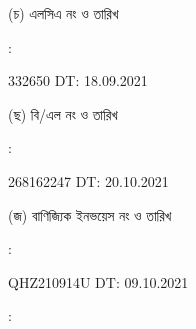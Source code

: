 \documentclass[12pt]{article}
\newcommand{\blno}{268162247}
\newcommand{\bldt}{20.10.2021}
\newcommand{\lcano}{332650}
\newcommand{\lcadt}{18.09.2021}
\newcommand{\invno}{QHZ210914U}
\newcommand{\invdt}{09.10.2021}
\begin{document}
\begin{minipage}[t]{0.05\linewidth}
\hspace*{1em}
\end{minipage}
\begin{minipage}[t]{0.45\linewidth}
(চ) এলসিএ নং ও তারিখ
\end{minipage}
\begin{minipage}[t]{0.02\linewidth}
:
\end{minipage}
\begin{minipage}[t]{0.50\linewidth}
{\lcano} \hspace{2em} DT: {\lcadt}
\\
\end{minipage}
\begin{minipage}[t]{0.05\linewidth}
\hspace*{1em}
\end{minipage}
\begin{minipage}[t]{0.45\linewidth}
(ছ) বি/এল নং ও তারিখ
\end{minipage}
\begin{minipage}[t]{0.02\linewidth}
:
\end{minipage}
\begin{minipage}[t]{0.50\linewidth}
{\blno} \hspace{2em} DT: {\bldt}
\\
\end{minipage}
\begin{minipage}[t]{0.05\linewidth}
\hspace*{1em}
\end{minipage}
\begin{minipage}[t]{0.45\linewidth}
(জ) বাণিজ্যিক ইনভয়েস নং ও তারিখ
\end{minipage}
\begin{minipage}[t]{0.02\linewidth}
:
\end{minipage}
\begin{minipage}[t]{0.50\linewidth}
{\invno} \hspace{2em} DT: {\invdt}
\\
\end{minipage}
\begin{minipage}[t]{0.05\linewidth}
\hspace*{1em}
\end{minipage}
\begin{minipage}[t]{0.45\linewidth}
\end{minipage}
\begin{minipage}[t]{0.02\linewidth}
:
\end{minipage}
\end{document}
